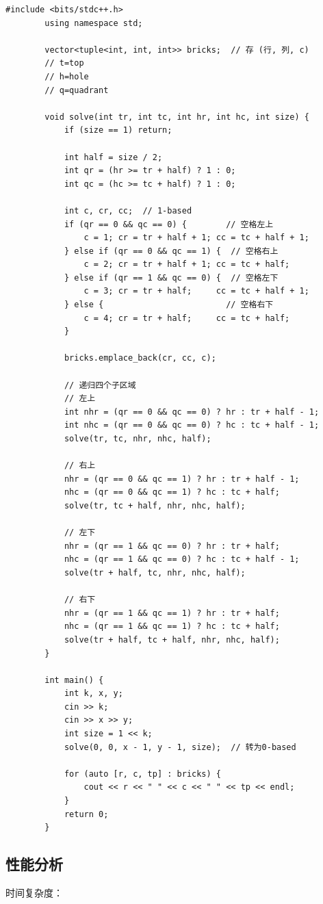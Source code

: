 \documentclass[supercite]{Experimental_Report}
\theoremstyle{definition}
\begin{document}
	\begin{lstlisting}[style=commonCodeStyle, caption={P1228.cpp}, label={lst:2-1}]
		#include <bits/stdc++.h>
		using namespace std;
		
		vector<tuple<int, int, int>> bricks;  // 存 (行, 列, c)
		// t=top
		// h=hole
		// q=quadrant
		
		void solve(int tr, int tc, int hr, int hc, int size) {
			if (size == 1) return;
			
			int half = size / 2;
			int qr = (hr >= tr + half) ? 1 : 0;
			int qc = (hc >= tc + half) ? 1 : 0;
			
			int c, cr, cc;  // 1-based
			if (qr == 0 && qc == 0) {        // 空格左上
				c = 1; cr = tr + half + 1; cc = tc + half + 1;
			} else if (qr == 0 && qc == 1) {  // 空格右上
				c = 2; cr = tr + half + 1; cc = tc + half;
			} else if (qr == 1 && qc == 0) {  // 空格左下
				c = 3; cr = tr + half;     cc = tc + half + 1;
			} else {                         // 空格右下
				c = 4; cr = tr + half;     cc = tc + half;
			}
			
			bricks.emplace_back(cr, cc, c);
			
			// 递归四个子区域
			// 左上
			int nhr = (qr == 0 && qc == 0) ? hr : tr + half - 1;
			int nhc = (qr == 0 && qc == 0) ? hc : tc + half - 1;
			solve(tr, tc, nhr, nhc, half);
			
			// 右上
			nhr = (qr == 0 && qc == 1) ? hr : tr + half - 1;
			nhc = (qr == 0 && qc == 1) ? hc : tc + half;
			solve(tr, tc + half, nhr, nhc, half);
			
			// 左下
			nhr = (qr == 1 && qc == 0) ? hr : tr + half;
			nhc = (qr == 1 && qc == 0) ? hc : tc + half - 1;
			solve(tr + half, tc, nhr, nhc, half);
			
			// 右下
			nhr = (qr == 1 && qc == 1) ? hr : tr + half;
			nhc = (qr == 1 && qc == 1) ? hc : tc + half;
			solve(tr + half, tc + half, nhr, nhc, half);
		}
		
		int main() {
			int k, x, y;
			cin >> k;
			cin >> x >> y;
			int size = 1 << k;
			solve(0, 0, x - 1, y - 1, size);  // 转为0-based
			
			for (auto [r, c, tp] : bricks) {
				cout << r << " " << c << " " << tp << endl;
			}
			return 0;
		}
	\end{lstlisting}
	
	\subsection{性能分析}
	时间复杂度：
	
\end{document}
